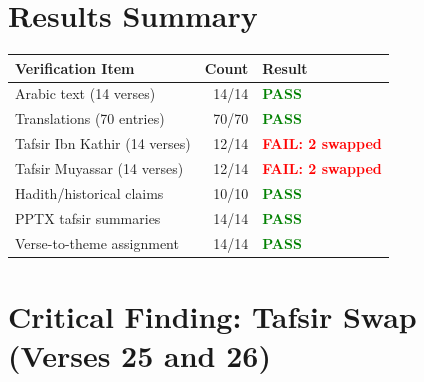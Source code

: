 \documentclass[11pt,a4paper]{article}
\begin{document}
\section*{Results Summary}

\begin{tabular}{lrl}
\toprule
\textbf{Verification Item} & \textbf{Count} & \textbf{Result} \\
\midrule
Arabic text (14 verses) & 14/14 & \textcolor{green}{\textbf{PASS}} \\
Translations (70 entries) & 70/70 & \textcolor{green}{\textbf{PASS}} \\
Tafsir Ibn Kathir (14 verses) & 12/14 & \textcolor{red}{\textbf{FAIL: 2 swapped}} \\
Tafsir Muyassar (14 verses) & 12/14 & \textcolor{red}{\textbf{FAIL: 2 swapped}} \\
Hadith/historical claims & 10/10 & \textcolor{green}{\textbf{PASS}} \\
PPTX tafsir summaries & 14/14 & \textcolor{green}{\textbf{PASS}} \\
Verse-to-theme assignment & 14/14 & \textcolor{green}{\textbf{PASS}} \\
\bottomrule
\end{tabular}

\section*{Critical Finding: Tafsir Swap (Verses 25 and 26)}
\end{document}
